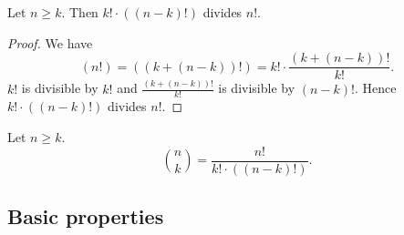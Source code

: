 \documentclass[../../arithmetic.tex]{subfiles}
\begin{document}
\begin{forthel}
    \begin{lemma}\label{Arithmetic_03_06_504192}
      Let $n \geq k$.
      Then $k! \cdot ((n - k)!)$ divides $n!$.
    \end{lemma}
    \begin{proof}
      We have \[ (n!) = ((k + (n - k))!) = k! \cdot \frac{(k + (n - k))!}{k!}. \]
      $k!$ is divisible by $k!$ and $\frac{(k + (n - k))!}{k!}$ is divisible by $(n - k)!$.
      Hence $k! \cdot ((n - k)!)$ divides $n!$.
    \end{proof}

    \begin{definition}
      Let $n \geq k$.
      \[ \binom{n}{k} = \frac{n!}{k! \cdot ((n - k)!)}. \]
    \end{definition}
  \end{forthel}


  \subsection{Basic properties}
\end{document}
